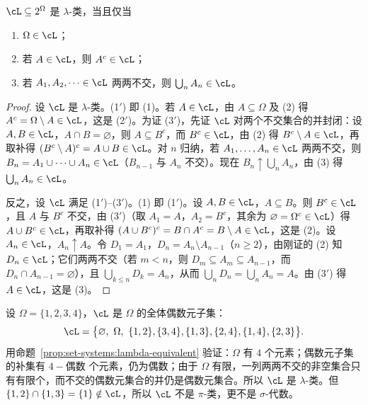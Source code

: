 \begin{proposition}\label{prop:set-systems:lambda-equivalent}
$\cL\subseteq2^\Omega$ 是 $\lambda$-类，当且仅当
\begin{enumerate}
\item[(1$'$)] $\Omega\in\cL$；
\item[(2$'$)] 若 $A\in\cL$，则 $A^c\in\cL$；
\item[(3$'$)] 若 $A_1,A_2,\dots\in\cL$ 两两不交，则 $\bigcup_nA_n\in\cL$。
\end{enumerate}
\end{proposition}
\begin{proof}
设 $\cL$ 是 $\lambda$-类。(1$'$) 即 (1)。若 $A\in\cL$，由 $A\subseteq\Omega$ 及 (2) 得 $A^c=\Omega\setminus A\in\cL$，这是 (2$'$)。为证 (3$'$)，先证 $\cL$ 对两个不交集合的并封闭：设 $A,B\in\cL$，$A\cap B=\varnothing$，则 $A\subseteq B^c$，而 $B^c\in\cL$，由 (2) 得 $B^c\setminus A\in\cL$，再取补得 $(B^c\setminus A)^c=A\cup B\in\cL$。对 $n$ 归纳，若 $A_1,\dots,A_n\in\cL$ 两两不交，则 $B_n=A_1\cup\cdots\cup A_n\in\cL$（$B_{n-1}$ 与 $A_n$ 不交）。现在 $B_n\uparrow\bigcup_nA_n$，由 (3) 得 $\bigcup_nA_n\in\cL$。

反之，设 $\cL$ 满足 (1$'$)–(3$'$)。(1) 即 (1$'$)。设 $A,B\in\cL$，$A\subseteq B$。则 $B^c\in\cL$，且 $A$ 与 $B^c$ 不交，由 (3$'$)（取 $A_1=A$，$A_2=B^c$，其余为 $\varnothing=\Omega^c\in\cL$）得 $A\cup B^c\in\cL$，再取补得 $(A\cup B^c)^c=B\cap A^c=B\setminus A\in\cL$，这是 (2)。设 $A_n\in\cL$，$A_n\uparrow A$。令 $D_1=A_1$，$D_n=A_n\setminus A_{n-1}$（$n\geqslant2$），由刚证的 (2) 知 $D_n\in\cL$；它们两两不交（若 $m<n$，则 $D_m\subseteq A_m\subseteq A_{n-1}$，而 $D_n\cap A_{n-1}=\varnothing$），且 $\bigcup_{k\leqslant n}D_k=A_n$，从而 $\bigcup_nD_n=\bigcup_nA_n=A$。由 (3$'$) 得 $A\in\cL$，这是 (3)。
\end{proof}

\begin{example}\label{ex:set-systems:even}
设 $\Omega=\{1,2,3,4\}$，$\cL$ 是 $\Omega$ 的全体偶数元子集：
\[
\cL=\bigl\{\varnothing,\ \Omega,\ \{1,2\},\{3,4\},\{1,3\},\{2,4\},\{1,4\},\{2,3\}\bigr\}.
\]
用命题~\ref{prop:set-systems:lambda-equivalent} 验证：$\Omega$ 有 $4$ 个元素；偶数元子集的补集有 $4-\text{偶数}$ 个元素，仍为偶数；由于 $\Omega$ 有限，一列两两不交的非空集合只有有限个，而不交的偶数元集合的并仍是偶数元集合。所以 $\cL$ 是 $\lambda$-类。但 $\{1,2\}\cap\{1,3\}=\{1\}\notin\cL$，所以 $\cL$ 不是 $\pi$-类，更不是 $\sigma$-代数。
\end{example}

